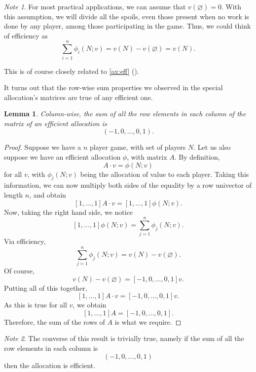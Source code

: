 \documentclass[12pt,letterpaper,final]{article}
\theoremstyle{plain}
\theoremstyle{plain}
\theoremstyle{plain}
\newtheorem{lemma}[theorem]{Lemma}
\theoremstyle{plain}
\theoremstyle{plain}
\theoremstyle{plain}
\theoremstyle{plain}
\theoremstyle{definition}
\theoremstyle{definition}
\theoremstyle{definition}
\theoremstyle{definition}
\theoremstyle{definition}
\theoremstyle{remark}
\theoremstyle{remark}
\newtheorem*{note}{Note}
\theoremstyle{remark}
\theoremstyle{remark}
\begin{document}
\begin{note}
  For most practical applications, we can assume that \(v(\varnothing
  )=0\). With this assumption, we will divide all the spoils, even
  those present when no work is done by any player, among those
  participating in the game. Thus, we could think of efficiency as
  \[
    \sum_{i=1}^n \phi_i(N;v) = v(N) -v(\varnothing) = v(N).
  \]
\end{note}
This is of course closely related to \cref{ax:eff} ().

It turns out that the row-wise sum properties we observed in the
special allocation's matrices are true of any efficient one.

\begin{lemma}\label{lem:rowwisesum}
  Column-wise, the sum of all the row elements in each column of the
  matrix of an
  efficient allocation is
  \[
      {\left(-1,0,\ldots,0,1\right)}.
  \]
\end{lemma}





\begin{proof}
  \begin{comment}
    This more efficient method of proof would be used
    in a journal version of this result. Historically, this style of
    proof was used by Einstein, too.
  \end{comment}
  Suppose we have a \(n\) player game, with set of players \(N\).
  Let us also suppose we have an efficient allocation \(\phi\), with
  matrix \(A\). 
  By definition,
  \[
    A\cdot v = \phi(N;v)
  \]
  for all \(v\),
  with \(\phi_j(N;v)\) being the allocation of value to each player.
  Taking this information, we can now multiply both sides of the
  equality by a row univector of length \(n\), and obtain
  \[
    [1, \ldots, 1] A\cdot v = [1, \ldots, 1] \phi(N;v).
  \]
  Now, taking the right hand side, we notice
  \[
    [1, \ldots, 1] \phi(N;v)= \sum_{j=1}^n \phi_j(N;v).
  \]
  Via efficiency,
  \[
    \sum_{j=1}^n \phi_j(N;v) = v(N) - v(\varnothing).
  \]
  Of course,
  \[
    v(N) - v(\varnothing) = [-1, 0, \ldots, 0, 1] v.
  \]
  Putting all of this together,
  \[
    [1, \ldots, 1]A\cdot v = [-1, 0, \ldots, 0, 1] v.
  \]
  As this is true for all \(v\), we obtain
  \[
    [1, \ldots, 1]A = [-1, 0, \ldots, 0, 1].
  \]
  Therefore, the sum of the rows of \(A\) is what we require.
\end{proof}

\begin{note}
  The converse of this result is trivially true, namely if the sum of
  all the row elements in each column is
  \[
    \left(-1 , 0 , \ldots , 0 , 1\right)
  \]
  then the allocation is efficient. 
\end{note}
\end{document}

